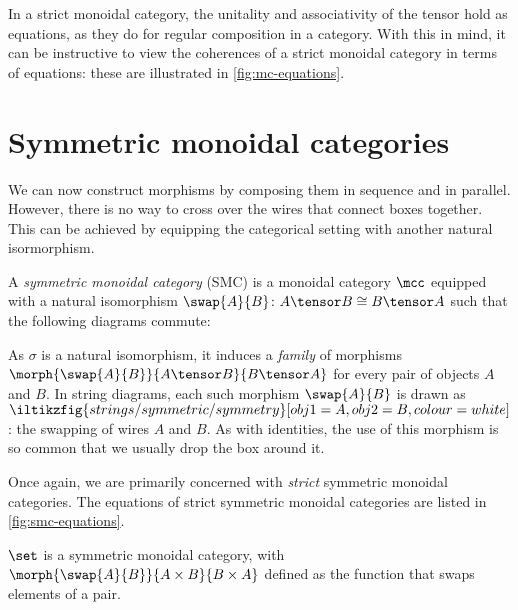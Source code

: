 In a strict monoidal category, the unitality and associativity of the tensor
hold as equations, as they do for regular composition in a category.
With this in mind, it can be instructive to view the coherences of a strict
monoidal category in terms of equations: these are illustrated in
\cref{fig:mc-equations}.




\section{Symmetric monoidal categories}

We can now construct morphisms by composing them in sequence and in parallel.
However, there is no way to cross over the wires that connect boxes together.
This can be achieved by equipping the categorical setting with another natural
isormorphism.

\begin{definition}
    \label{def:symmetric-monoidal-category}
    A \emph{symmetric monoidal category} (SMC) is a monoidal category \(\mcc\)
    equipped with a natural isomorphism \(
    \swap{A}{B} \colon A \tensor B \cong B \tensor A
    \) such that the following diagrams commute:
    \begin{center}
        
        

        \vspace{1em}

        
    \end{center}
\end{definition}

As \(\sigma\) is a natural isomorphism, it induces
a \emph{family} of morphisms \(
\morph{\swap{A}{B}}{A \tensor B}{B \tensor A}
\) for every pair of objects \(A\) and \(B\).
In string diagrams, each such morphism \(\swap{A}{B}\) is drawn as \(
\iltikzfig{strings/symmetric/symmetry}[obj1=A, obj2=B, colour=white]
\): the swapping of wires \(A\) and \(B\).
As with identities, the use of this morphism is so common that we usually
drop the box around it.

Once again, we are primarily concerned with \emph{strict} symmetric
monoidal categories.
The equations of strict symmetric monoidal categories are listed in
\cref{fig:smc-equations}.



\begin{example}
    \(\set\) is a symmetric monoidal category, with \(
    \morph{\swap{A}{B}}{A \times B}{B \times A}
    \) defined as the function that swaps elements of a pair.
\end{example}